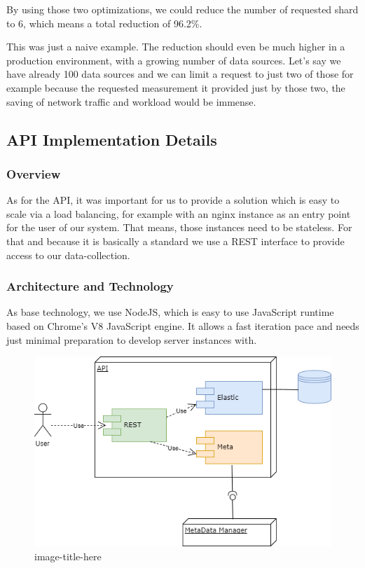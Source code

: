 By using those two optimizations, we could reduce the number of
requested shard to 6, which means a total reduction of 96.2\%.

This was just a naive example. The reduction should even be much higher
in a production environment, with a growing number of data sources.
Let's say we have already 100 data sources and we can limit a request to
just two of those for example because the requested measurement it
provided just by those two, the saving of network traffic and workload
would be immense.

\subsection{API Implementation
Details}\label{api-implementation-details}

\subsubsection{Overview}\label{overview-1}

As for the API, it was important for us to provide a solution which is
easy to scale via a load balancing, for example with an nginx instance
as an entry point for the user of our system. That means, those
instances need to be stateless. For that and because it is basically a
standard we use a REST interface to provide access to our
data-collection.

\subsubsection{Architecture and
Technology}\label{architecture-and-technology}

As base technology, we use NodeJS, which is easy to use JavaScript
runtime based on Chrome's V8 JavaScript engine. It allows a fast
iteration pace and needs just minimal preparation to develop server
instances with.

\begin{figure}[htbp]
\centering
\includegraphics{images/07_API_Architecture.png}
\caption{image-title-here}
\end{figure}

